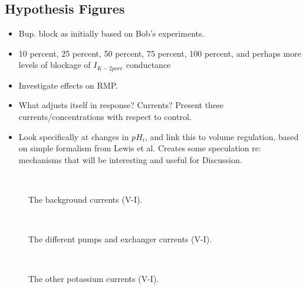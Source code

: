 \subsection{Hypothesis Figures}
\begin{itemize}
\item Bup. block as initially based on Bob's experiments.
\item 10 percent, 25 percent, 50 percent, 75 percent, 100 percent, and
  perhaps more levels of blockage of $I_{K-2pore}$ conductance
\item Investigate effects on RMP.
\item What adjusts itself in response? Currents? Present these
    currents/concentrations with respect to control.
\item Look specifically at changes in $pH_i$, and link this to volume
  regulation, based on simple formalism from Lewis et al. Creates some
  speculation re: mechanisms that will be interesting and useful for
  Discussion.
\end{itemize}

\begin{figure}
  \centering
  \\
  \subfloat{\hspace{0.36\textwidth}}
  \caption{The background currents (V-I).}
  \label{fig:background-currents-vi}
\end{figure}

\begin{figure}
  \centering
  \\
  \subfloat{\hspace{0.36\textwidth}}
  \caption{The different pumps and exchanger currents (V-I).}
  \label{fig:pumps-and-exchangers-vi}
\end{figure}

\begin{figure}
  \centering
  \\
  \caption{The other potassium currents (V-I).}
  \label{fig:potassium-currents-vi}
\end{figure}

